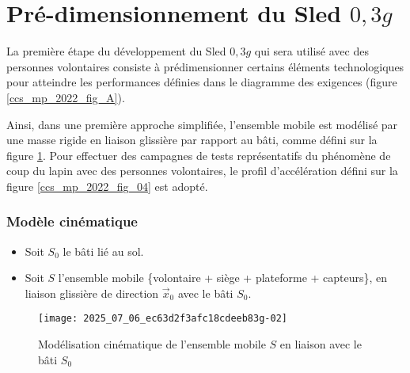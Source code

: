 
\section{Pré-dimensionnement du Sled $0,3 g$ \label{ccs_mp_2022_sec_2}}
\ifprof
\else
La première étape du développement du Sled $0,3 g$ qui sera utilisé avec des personnes volontaires consiste à prédimensionner certains éléments technologiques pour atteindre les performances définies dans le diagramme des exigences (figure \ref{ccs_mp_2022_fig_A}).

Ainsi, dans une première approche simplifiée, l'ensemble mobile est modélisé par une masse rigide en liaison glissière par rapport au bâti, comme défini sur la figure \ref{ccs_mp_2022_fig_03}. Pour effectuer des campagnes de tests représentatifs du phénomène de coup du lapin avec des personnes volontaires, le profil d'accélération défini sur la figure \ref{ccs_mp_2022_fig_04} est adopté.

\subsubsection*{Modèle cinématique}
\begin{itemize}
  \item Soit $S_{0}$ le bâti lié au sol.
  \item Soit $S$ l'ensemble mobile \{volontaire + siège + plateforme + capteurs\}, en liaison glissière de direction $\vec{x}_{0}$ avec le bâti $S_{0}$.
\end{itemize}

\begin{figure}[!h]
\centering
\texttt{[image: 2025\_07\_06\_ec63d2f3afc18cdeeb83g-02]}
\caption{\label{ccs_mp_2022_fig_03} Modélisation cinématique de l'ensemble mobile $S$ en liaison avec le bâti $S_{0}$}
\end{figure}



